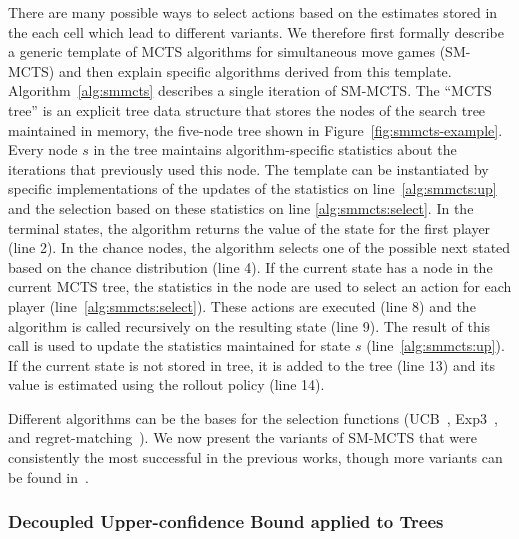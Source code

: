 There are many possible ways to select actions based on the estimates stored in the each cell which lead to different variants.
We therefore first formally describe a generic template of MCTS algorithms for simultaneous move games (SM-MCTS) and then explain specific algorithms derived from this template.
Algorithm~\ref{alg:smmcts} describes a single iteration of SM-MCTS.
The ``MCTS tree'' is an explicit tree data structure that stores the nodes of the search tree maintained in memory,
\eg the five-node tree shown in Figure~\ref{fig:smmcts-example}.
Every node $s$ in the tree maintains algorithm-specific statistics about the iterations that previously used this node.
The template can be instantiated by specific implementations of the updates of the statistics on line~\ref{alg:smmcts:up} and the selection based on these statistics on line \ref{alg:smmcts:select}.
In the terminal states, the algorithm returns the value of the state for the first player (line 2).
In the chance nodes, the algorithm selects one of the possible next stated based on the chance distribution (line 4).
If the current state has a node in the current MCTS tree, the statistics in the node are used to select an action for each player (line~\ref{alg:smmcts:select}).
These actions are executed (line 8) and the algorithm is called recursively on the resulting state (line 9).
The result of this call is used to update the statistics maintained for state $s$ (line~\ref{alg:smmcts:up}).
If the current state is not stored in tree, it is added to the tree (line 13) and its value is estimated using the rollout policy (line 14).

Different algorithms can be the bases for the selection functions (\eg UCB~\cite{UCB}, Exp3~\cite{Auer2003Exp3}, and regret-matching~\cite{Hart00}).
We now present the variants of SM-MCTS that were consistently the most successful in the previous works,
though more variants can be found in~\cite{Perick12Comparison,Lanctot13Tron,Tak14smmcts}.

\subsubsection{Decoupled Upper-confidence Bound applied to Trees}\label{sec:duct}

